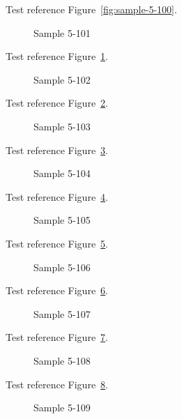 Test reference Figure~\ref{fig:sample-5-100}.

\begin{figure}[tbhp]
\caption{Sample 5-101}
\label{fig:sample-5-101}
\end{figure}

Test reference Figure~\ref{fig:sample-5-101}.

\begin{figure}[tbhp]
\caption{Sample 5-102}
\label{fig:sample-5-102}
\end{figure}

Test reference Figure~\ref{fig:sample-5-102}.

\begin{figure}[tbhp]
\caption{Sample 5-103}
\label{fig:sample-5-103}
\end{figure}

Test reference Figure~\ref{fig:sample-5-103}.

\begin{figure}[tbhp]
\caption{Sample 5-104}
\label{fig:sample-5-104}
\end{figure}

Test reference Figure~\ref{fig:sample-5-104}.

\begin{figure}[tbhp]
\caption{Sample 5-105}
\label{fig:sample-5-105}
\end{figure}

Test reference Figure~\ref{fig:sample-5-105}.

\begin{figure}[tbhp]
\caption{Sample 5-106}
\label{fig:sample-5-106}
\end{figure}

Test reference Figure~\ref{fig:sample-5-106}.

\begin{figure}[tbhp]
\caption{Sample 5-107}
\label{fig:sample-5-107}
\end{figure}

Test reference Figure~\ref{fig:sample-5-107}.

\begin{figure}[tbhp]
\caption{Sample 5-108}
\label{fig:sample-5-108}
\end{figure}

Test reference Figure~\ref{fig:sample-5-108}.

\begin{figure}[tbhp]
\caption{Sample 5-109}
\label{fig:sample-5-109}
\end{figure}

